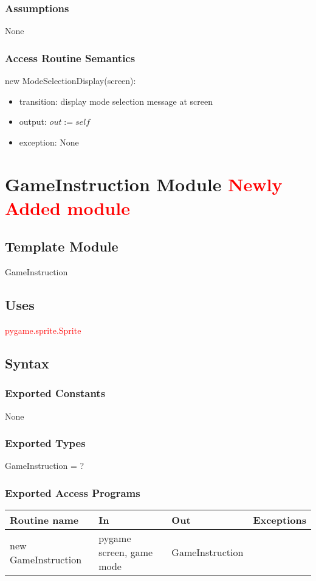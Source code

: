 \documentclass[12pt]{article}
\begin{document}
\subsubsection*{Assumptions}
None
\subsubsection*{Access Routine Semantics}
\noindent new ModeSelectionDisplay(screen):
\begin{itemize}
\item transition: display mode selection message at screen
\item output: $out := \mathit{self}$
\item exception: None
\end{itemize}
\newpage

\section{GameInstruction Module \textcolor{red}{Newly Added module}}

\subsection*{Template Module}
GameInstruction

\subsection*{Uses}
\textcolor{red}{pygame.sprite.Sprite}

\subsection*{Syntax}
\subsubsection*{Exported Constants}
None
\subsubsection*{Exported Types}
GameInstruction = ?
\subsubsection*{Exported Access Programs}
\begin{tabular}{| l | l | l | p{5cm} |}
\hline
\textbf{Routine name} & \textbf{In} & \textbf{Out} & \textbf{Exceptions}\\
\hline
new GameInstruction & pygame screen, game mode &GameInstruction & \\
\hline

\end{tabular}
\end{document}
